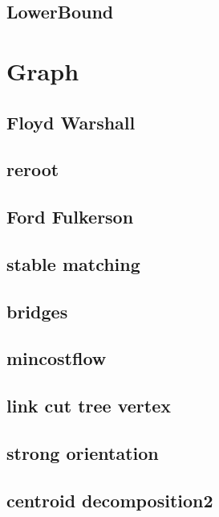 \subsection{LowerBound}
\raggedbottom
\hrulefill

\section{Graph}
\subsection{Floyd Warshall}
\raggedbottom
\hrulefill
\subsection{reroot}
\raggedbottom
\hrulefill
\subsection{Ford Fulkerson}
\raggedbottom
\hrulefill
\subsection{stable matching}
\raggedbottom
\hrulefill
\subsection{bridges}
\raggedbottom
\hrulefill
\subsection{mincostflow}
\raggedbottom
\hrulefill
\subsection{link cut tree vertex}
\raggedbottom
\hrulefill
\subsection{strong orientation}
\raggedbottom
\hrulefill
\subsection{centroid decomposition2}
\raggedbottom
\hrulefill
